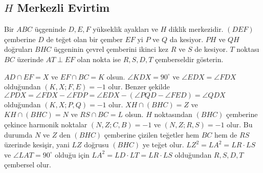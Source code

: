 \documentclass[12pt]{scrartcl}
\begin{document}
\subsection*{$H$ Merkezli Evirtim}

\begin{problem}
    Bir $ABC$ üçgeninde $D,E,F$ yükseklik ayakları ve $H$ diklik merkezidir. $(DEF)$ çemberine $D$ de teğet olan bir çember $EF$ yi $P$ ve $Q$ da kesiyor. $PH$ ve $QH$ doğruları $BHC$ üçgeninin çevrel çemberini ikinci kez $R$ ve $S$ de kesiyor. $T$ noktası $BC$ üzerinde $AT\perp EF$ olan nokta ise $R,S,D,T$ çemberseldir gösterin.
\end{problem}

\begin{answer*}
    $AD\cap EF=X$ ve $EF\cap BC=K$ olsun. $\angle KDX=90^{\circ}$ ve $\angle EDX=\angle FDX$ olduğundan $(K,X;F,E)=-1$ olur. Benzer şekilde $\angle PDX=\angle FDX-\angle FDP=\angle EDX-(\angle PQD-\angle FED)=\angle QDX$ olduğundan $(K,X;P,Q)=-1$ olur. $XH\cap (BHC)=Z$ ve $KH\cap (BHC)=N$ ve $RS\cap BC=L$ olsun. $H$ noktasından $(BHC)$ çemberine çekince harmonik noktalar $(N,Z;C,B)=-1$ ve $(N,Z;R,S)=-1$ olur. Bu durumda $N$ ve $Z$ den $(BHC)$ çemberine çizilen teğetler hem $BC$ hem de $RS$ üzerinde kesişir, yani $LZ$ doğrusu $(BHC)$ ye teğet olur. $LZ^2=LA^2=LR\cdot LS$ ve $\angle LAT=90^{\circ}$ olduğu için $LA^2=LD\cdot LT=LR\cdot LS$ olduğundan $R,S,D,T$ çembersel olur. 
\end{answer*}
\end{document}
